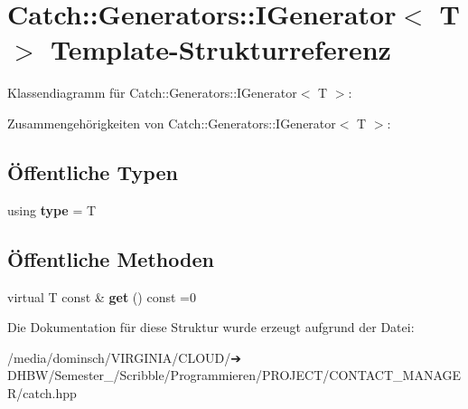 \hypertarget{structCatch_1_1Generators_1_1IGenerator}{}\section{Catch\+:\+:Generators\+:\+:I\+Generator$<$ T $>$ Template-\/\+Strukturreferenz}
\label{structCatch_1_1Generators_1_1IGenerator}


Klassendiagramm für Catch\+:\+:Generators\+:\+:I\+Generator$<$ T $>$\+:


Zusammengehörigkeiten von Catch\+:\+:Generators\+:\+:I\+Generator$<$ T $>$\+:
\subsection*{Öffentliche Typen}
\begin{DoxyCompactItemize}
\item 
\mbox{\label{structCatch_1_1Generators_1_1IGenerator_a1f8677875fe0ff31f39c60d45504b9a5}} 
using {\bfseries type} = T
\end{DoxyCompactItemize}
\subsection*{Öffentliche Methoden}
\begin{DoxyCompactItemize}
\item 
\mbox{\label{structCatch_1_1Generators_1_1IGenerator_a525d381fc9249a885b075a0632a8579a}} 
virtual T const  \& {\bfseries get} () const =0
\end{DoxyCompactItemize}


Die Dokumentation für diese Struktur wurde erzeugt aufgrund der Datei\+:\begin{DoxyCompactItemize}
\item 
/media/dominsch/\+V\+I\+R\+G\+I\+N\+I\+A/\+C\+L\+O\+U\+D/➔ D\+H\+B\+W/\+Semester\+\_/\+Scribble/\+Programmieren/\+P\+R\+O\+J\+E\+C\+T/\+C\+O\+N\+T\+A\+C\+T\+\_\+\+M\+A\+N\+A\+G\+E\+R/catch.\+hpp\end{DoxyCompactItemize}

